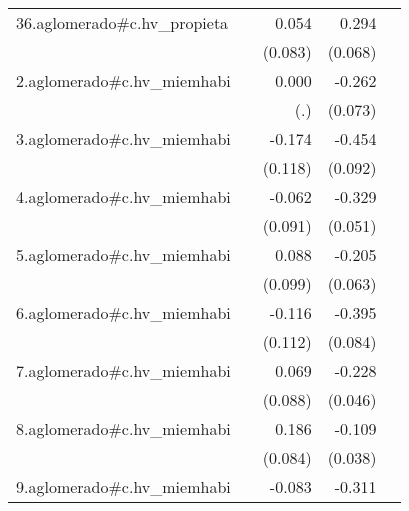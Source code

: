 {\begin{longtable}{l*{4}{D{.}{.}{-1}}}
\addlinespace
36.aglomerado#c.hv\_propieta&                     &       0.054         &       0.294\sym{***}&                     \\
            &                     &     (0.083)         &     (0.068)         &                     \\
\addlinespace
2.aglomerado#c.hv\_miemhabi&                     &       0.000         &      -0.262\sym{***}&                     \\
            &                     &         (.)         &     (0.073)         &                     \\
\addlinespace
3.aglomerado#c.hv\_miemhabi&                     &      -0.174         &      -0.454\sym{***}&                     \\
            &                     &     (0.118)         &     (0.092)         &                     \\
\addlinespace
4.aglomerado#c.hv\_miemhabi&                     &      -0.062         &      -0.329\sym{***}&                     \\
            &                     &     (0.091)         &     (0.051)         &                     \\
\addlinespace
5.aglomerado#c.hv\_miemhabi&                     &       0.088         &      -0.205\sym{**} &                     \\
            &                     &     (0.099)         &     (0.063)         &                     \\
\addlinespace
6.aglomerado#c.hv\_miemhabi&                     &      -0.116         &      -0.395\sym{***}&                     \\
            &                     &     (0.112)         &     (0.084)         &                     \\
\addlinespace
7.aglomerado#c.hv\_miemhabi&                     &       0.069         &      -0.228\sym{***}&                     \\
            &                     &     (0.088)         &     (0.046)         &                     \\
\addlinespace
8.aglomerado#c.hv\_miemhabi&                     &       0.186\sym{*}  &      -0.109\sym{**} &                     \\
            &                     &     (0.084)         &     (0.038)         &                     \\
\addlinespace
9.aglomerado#c.hv\_miemhabi&                     &      -0.083         &      -0.311\sym{***}&                     \\

\end{longtable}}
